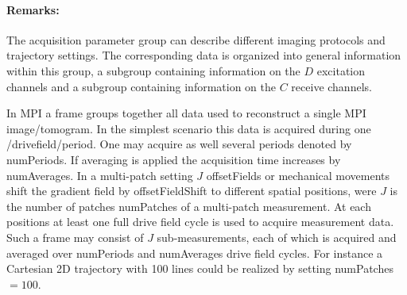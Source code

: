 \documentclass[landscape,a4paper]{article} %
\newcommand{\inlvar}[1]{{\ttfamily#1}}
\begin{document}
\begin{multicols}{2}
\paragraph{Remarks:} The acquisition parameter group can describe different imaging protocols and trajectory settings. The corresponding data is organized into general information within this group, a subgroup containing information on the $D$ excitation channels and a subgroup containing information on the $C$ receive channels.

In MPI a frame groups together all data used to reconstruct a single MPI image/tomogram. In the simplest scenario this data is acquired during one \inlvar{/drivefield/period}. One may acquire as well several periods denoted by \inlvar{numPeriods}. If averaging is applied the acquisition time increases by \inlvar{numAverages}. In a multi-patch setting $J$ \inlvar{offsetField}s or mechanical movements shift the gradient field by \inlvar{offsetFieldShift} to different spatial positions, were $J$ is the number of patches \inlvar{numPatches} of a multi-patch measurement. At each positions at least one full drive field cycle is used to acquire measurement data. Such a frame may consist of $J$ sub-measurements, each of which is acquired and averaged over \inlvar{numPeriods} and \inlvar{numAverages} drive field cycles. For instance a Cartesian 2D trajectory with 100 lines could be realized by setting \mbox{\inlvar{numPatches} $ = 100$}.
\end{multicols}
\end{document}
